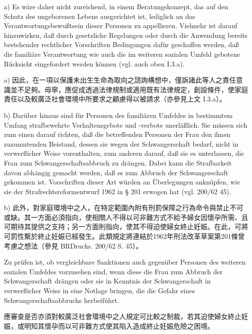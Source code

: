 \documentclass[12pt]{article}
\begin{document}
\begin{sourcepara}[title={原文D.155}]
a) Es wäre daher nicht zureichend, in einem Beratungskonzept, das auf den Schutz des ungeborenen Lebens ausgerichtet ist, lediglich an das Verantwortungsbewußtsein dieser Personen zu appellieren. Vielmehr ist darauf hinzuwirken, daß durch gesetzliche Regelungen oder durch die Anwendung bereits bestehender rechtlicher Vorschriften Bedingungen dafür geschaffen werden, daß die familiäre Verantwortung wie auch die im weiteren sozialen Umfeld gebotene Rücksicht eingefordert werden können (vgl. auch oben I.3.a).
\end{sourcepara}
\begin{transpara}
a) 因此，在一項以保護未出生生命為取向之諮詢構想中，僅訴諸此等人之責任意識並不足夠。毋寧，應促成透過法律規制或適用既有法律規定，創設條件，使家庭責任以及較廣泛社會環境中所要求之顧慮得以被請求（亦參見上文 I.3.a）。
\end{transpara}

\begin{sourcepara}[title={原文D.156}]
b) Darüber hinaus sind für Personen des familiären Umfeldes in bestimmtem Umfang strafbewehrte Verhaltensgebote und -verbote unerläßlich. Sie müssen sich zum einen darauf richten, daß die betreffenden Personen der Frau den ihnen zuzumutenden Beistand, dessen sie wegen der Schwangerschaft bedarf, nicht in verwerflicher Weise vorenthalten, zum anderen darauf, daß sie es unterlassen, die Frau zum Schwangerschaftsabbruch zu drängen. Dabei kann die Strafbarkeit davon abhängig gemacht werden, daß es zum Abbruch der Schwangerschaft gekommen ist. Vorschriften dieser Art würden an Überlegungen anknüpfen, wie sie der Strafrechtsreformentwurf 1962 in § 201 erwogen hat (vgl. \abbrBRDrucks{} 200/62 \abbrS{} 45).
\end{sourcepara}
\begin{transpara}
b) 此外，對家庭環境中之人，在特定範圍內附有刑罰保障之行為命令與禁止不可或缺。其一方面必須指向，使相關人不得以可非難方式不給予婦女因懷孕所需、且可期待其提供之支持；另一方面則指向，使其不得迫使婦女終止妊娠。在此，可將可罰性繫於終止妊娠已經發生。此類規定將連結於1962年刑法改革草案第201條曾考慮之想法（參見 BRDrucks. 200/62 S. 45）。
\end{transpara}

\begin{sourcepara}[title={原文D.157}]
Zu prüfen ist, ob vergleichbare Sanktionen auch gegenüber Personen des weiteren sozialen Umfeldes vorzusehen sind, wenn diese die Frau zum Abbruch der Schwangerschaft drängen oder sie in Kenntnis der Schwangerschaft in verwerflicher Weise in eine Notlage bringen, die die Gefahr eines Schwangerschaftsabbruchs herbeiführt.
\end{sourcepara}
\begin{transpara}
應審查是否亦須對較廣泛社會環境中之人規定可比較之制裁，若其迫使婦女終止妊娠，或明知其懷孕而以可非難方式使其陷入造成終止妊娠危險之困境。
\end{transpara}
\end{document}
